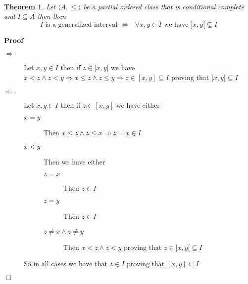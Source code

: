 \documentclass{book}
\newenvironment{proof}{\noindent\textbf{Proof\ }}{\hspace*{\fill}$\Box$\medskip}
\newtheorem{theorem}{Theorem}
\begin{document}
\

\begin{theorem}
  \label{interval generalized interval condition}Let $\langle A, \leqslant
  \rangle$ be a partial ordered class that is conditional complete and $I
  \subseteq A$ then then
  \[ I \text{ is a generalized interval } \Leftrightarrow \text{ } \forall x,
     y \in I \text{ we have }] x, y [\subseteq I \]
\end{theorem}

\begin{proof}
  
  \begin{description}
    \item[$\Rightarrow$] Let $x, y \in I$ then if $z \in] x, y [$ we have $x <
    z \wedge z < y \Rightarrow x \leqslant z \wedge z \leqslant y \Rightarrow
    z \in [x, y] \subseteq I$ proving that $] x, y [\subseteq I$
    
    \item[$\Leftarrow$] Let $x, y \in I$ then if $z \in [x, y]$ we have either
    \begin{description}
      \item[$x = y$] Then $x \leqslant z \wedge z \leqslant x \Rightarrow z =
      x \in I$
      
      \item[$x < y$] Then we have either
      \begin{description}
        \item[$z = x$] Then $z \in I$
        
        \item[$z = y$] Then $z \in I$
        
        \item[$z \neq x \wedge z \neq y$] Then $x < z \wedge z < y$ proving
        that $z \in] x, y [\subseteq I$
      \end{description}
    \end{description}
    So in all cases we have that $z \in I$ proving that $[x, y] \subseteq I$
  \end{description}
\end{proof}
\end{document}
